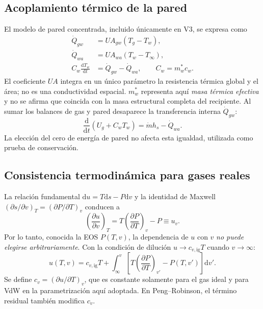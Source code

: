 \documentclass[11pt,letterpaper]{article}
\newcommand{\dd}{\mathrm{d}}
\begin{document}
\subsection{Acoplamiento térmico de la pared}
El modelo de pared concentrada, incluido únicamente en V3, se expresa como
\begin{align}
\dot Q_{gw} &= UA_{gw}(T_g-T_w),\\
\dot Q_{wa} &= UA_{wa}(T_w-T_\infty),\\
C_w\frac{\dd T_w}{\dd t}&=\dot Q_{gw}-\dot Q_{wa},\qquad C_w=m_w^*c_w.\label{eq:pared}
\end{align}
El coeficiente $UA$ integra en un único parámetro la resistencia térmica global y el área; no es una conductividad espacial. $m_w^*$ representa aquí \emph{masa térmica efectiva} y no se afirma que coincida con la masa estructural completa del recipiente. Al sumar los balances de gas y pared desaparece la transferencia interna $\dot Q_{gw}$:
\begin{equation}
\frac{\dd}{\dd t}(U_g+C_wT_w)=\dot m h_s-\dot Q_{wa}.\label{eq:global}
\end{equation}
La elección del cero de energía de pared no afecta esta igualdad, utilizada como prueba de conservación.

\subsection{Consistencia termodinámica para gases reales}
La relación fundamental $\dd u=T\dd s-P\dd v$ y la identidad de Maxwell $(\partial s/\partial v)_T=(\partial P/\partial T)_v$ conducen a
\begin{equation}
\boxed{\left(\frac{\partial u}{\partial v}\right)_T=T\left(\frac{\partial P}{\partial T}\right)_v-P\equiv u_v.}\label{eq:maxwell}
\end{equation}
Por lo tanto, conocida la EOS $P(T,v)$, la dependencia de $u$ con $v$ \emph{no puede elegirse arbitrariamente}. Con la condición de dilución $u\to c_{v,\mathrm{ig}}T$ cuando $v\to\infty$:
\begin{equation}
u(T,v)=c_{v,\mathrm{ig}}T+\int_{\infty}^{v}\left[T\left(\frac{\partial P}{\partial T}\right)_{v'}-P(T,v')\right]\dd v'.\label{eq:ures}
\end{equation}
Se define $c_v=(\partial u/\partial T)_v$, que es constante solamente para el gas ideal y para VdW en la parametrización aquí adoptada. En Peng--Robinson, el término residual también modifica $c_v$.
\end{document}
